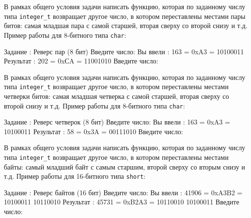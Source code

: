
\begin{zztask}
В рамках общего условия задачи написать функцию, которая по заданному числу
типа \texttt{integer\_t} возвращает другое число, в котором переставлены
местами пары битов: самая младшая пара с самой старшей, вторая
сверху со второй снизу и т.д.
Пример работы для 8-битного типа \texttt{char}:
\begin{zzoutput}
  Задание \thezztask: Реверс пар (8 бит)
  Введите число: 
  Вы ввели  :  163 = 0xA3 = 10100011
  Результат :  202 = 0xСA = 11001010
  Введите число: \zzuser{ }
\end{zzoutput}
\end{zztask}


\begin{zztask}
В рамках общего условия задачи написать функцию, которая по заданному числу
типа \texttt{integer\_t} возвращает другое число, в котором переставлены
местами четверки битов: самая младшая четверка с самой старшей, вторая
сверху со второй снизу и т.д.
Пример работы для 8-битного типа \texttt{char}:
\begin{zzoutput}
  Задание \thezztask: Реверс четверок (8 бит)
  Введите число: 
  Вы ввели  :  163 = 0xA3 = 10100011
  Результат :   58 = 0x3A = 00111010
  Введите число: \zzuser{ }
\end{zzoutput}
\end{zztask}


\begin{zztask}
В рамках общего условия задачи написать функцию, которая по заданному числу
типа \texttt{integer\_t} возвращает другое число, в котором переставлены
местами байты: самый младший байт с самым старшим, второй сверху со вторым
снизу и т.д.
Пример работы для 16-битного типа \texttt{short}:
\begin{zzoutput}
  Задание \thezztask: Реверс байтов (16 бит)
  Введите число: 
  Вы ввели  : 41906 = 0xA3B2 = 10100011 10110010
  Результат : 45731 = 0xB2A3 = 10110010 10100011
  Введите число: \zzuser{ }
\end{zzoutput}
\end{zztask}

